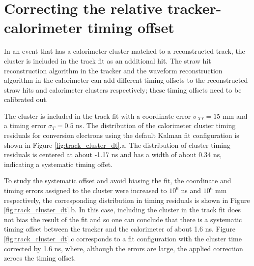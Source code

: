 \section{Correcting {\blue the} relative tracker-calorimeter timing offset}

In an event  {\blue that} has a calorimeter cluster  {\blue matched}
to a reconstructed track, the
cluster is included in the track fit as an additional hit. 
{\blue The straw hit reconstruction algorithm in the tracker and the waveform reconstruction 
algorithm
in the calorimeter can add different timing offsets to the reconstructed straw hits and 
calorimeter
clusters respectively; these timing offsets need to be calibrated out.}


{\blue The cluster is included in the track fit with a coordinate error $\sigma_{XY} = 15$ mm
and a timing error $\sigma_T = 0.5$ ns.}
The distribution of the calorimeter cluster timing residuals for conversion electrons 
{\blue using the} default Kalman fit 
configuration is shown in Figure \ref{fig:track_cluster_dt}.a. 
The distribution of cluster timing residuals 
is centered at about -1.17 ns and has a width of about 0.34 ns,  {\blue indicating a systematic timing offet.}

To study the  {\blue systematic offset} and avoid biasing the fit, the 
{\blue coordinate and timing} errors assigned to the 
cluster were increased to $10^6$  {\blue ns and $10^6$ mm respectively},
the corresponding distribution in timing residuals is shown in Figure 
\ref{fig:track_cluster_dt}.b. 
In this case,  {\blue including} the cluster in the track fit
{\blue does not} bias the result of the fit and {\blue so} one can conclude 
that there is a systematic timing offset between the tracker and the calorimeter {\blue of about 1.6 ns.}
Figure \ref{fig:track_cluster_dt}.c corresponds to  {\blue a} fit configuration with
the cluster time corrected by 1.6 ns, {\blue where, although the errors are large, the}
 applied correction zeroes the timing offset.

